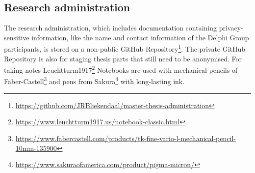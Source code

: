 \subsection{Research administration}
\label{sub:tbresearchadministration}
The research administration, which includes documentation containing privacy-sensitive information, like the name and contact information of the Delphi Group participants, is stored on a non-public GitHub Repository\footnote{\url{https://github.com/JRBliekendaal/master-thesis-administration}}. The private GitHub Repository is also for staging thesis parts that still need to be anonymised. For taking notes Leuchtturm1917\footnote{\url{https://www.leuchtturm1917.us/notebook-classic.html}} Notebooks are used with mechanical pencils of Faber-Castell\footnote{\url{https://www.fabercastell.com/products/tk-fine-vario-l-mechanical-pencil-10mm-135900}} and pens from Sakura\footnote{\url{https://www.sakuraofamerica.com/product/pigma-micron/}} with long-lasting ink.
